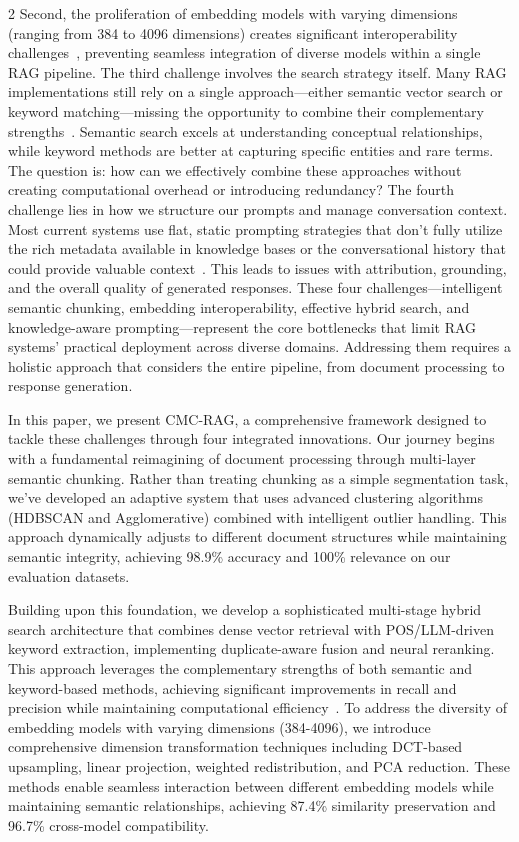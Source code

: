 \documentclass[10pt,letterpaper]{article}
\let\cite\citep
\begin{document}
\begin{multicols}{2}
Second, the proliferation of embedding models with varying dimensions (ranging from 384 to 4096 dimensions) creates significant interoperability challenges~\cite{huerga2025optimization, brown2024cross, conneau2018word}, preventing seamless integration of diverse models within a single RAG pipeline. The third challenge involves the search strategy itself. Many RAG implementations still rely on a single approach—either semantic vector search or keyword matching—missing the opportunity to combine their complementary strengths~\cite{hsu2025dat, gao2021retrieval, mao2023neural}. Semantic search excels at understanding conceptual relationships, while keyword methods are better at capturing specific entities and rare terms. The question is: how can we effectively combine these approaches without creating computational overhead or introducing redundancy? The fourth challenge lies in how we structure our prompts and manage conversation context. Most current systems use flat, static prompting strategies that don't fully utilize the rich metadata available in knowledge bases or the conversational history that could provide valuable context~\cite{gupta2024comprehensive, wei2022chain, liu2023chained}. This leads to issues with attribution, grounding, and the overall quality of generated responses. These four challenges—intelligent semantic chunking, embedding interoperability, effective hybrid search, and knowledge-aware prompting—represent the core bottlenecks that limit RAG systems' practical deployment across diverse domains. Addressing them requires a holistic approach that considers the entire pipeline, from document processing to response generation.

In this paper, we present CMC-RAG, a comprehensive framework designed to tackle these challenges through four integrated innovations. Our journey begins with a fundamental reimagining of document processing through multi-layer semantic chunking. Rather than treating chunking as a simple segmentation task, we've developed an adaptive system that uses advanced clustering algorithms (HDBSCAN and Agglomerative) combined with intelligent outlier handling. This approach dynamically adjusts to different document structures while maintaining semantic integrity, achieving 98.9\% accuracy and 100\% relevance on our evaluation datasets.

Building upon this foundation, we develop a sophisticated multi-stage hybrid search architecture that combines dense vector retrieval with POS/LLM-driven keyword extraction, implementing duplicate-aware fusion and neural reranking. This approach leverages the complementary strengths of both semantic and keyword-based methods, achieving significant improvements in recall and precision while maintaining computational efficiency~\cite{lee2024hybgrag}. To address the diversity of embedding models with varying dimensions (384-4096), we introduce comprehensive dimension transformation techniques including DCT-based upsampling, linear projection, weighted redistribution, and PCA reduction. These methods enable seamless interaction between different embedding models while maintaining semantic relationships, achieving 87.4\% similarity preservation and 96.7\% cross-model compatibility.


\end{multicols}
\end{document}
